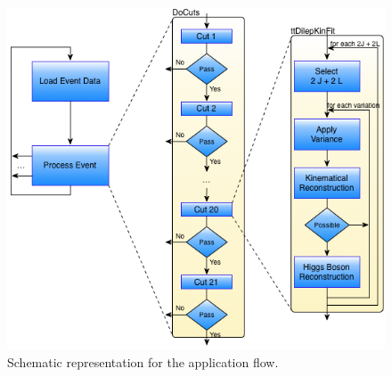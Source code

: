 \begin{figure}[!htp]
	\begin{center}
		\includegraphics[scale=0.4]{images/graf_abstract_flow_with_kinfit.png}
		\caption{Schematic representation for the \tth application flow.}
		\label{fig:flow}
	\end{center}
\end{figure}

